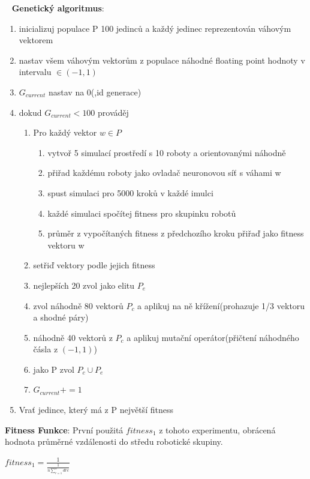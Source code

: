 \ \newline
\textbf{Genetický algoritmus}:
\begin{enumerate}
    \item inicializuj populace P 100 jedinců a každý jedinec reprezentován váhovým vektorem
    \item nastav všem váhovým vektorům z populace náhodné floating point hodnoty v intervalu $\in (-1,1)$ 
    \item $G_{current}$ nastav na 0(,id generace)
    \item dokud $G_{current} < 100$ prováděj \begin{enumerate}
        \item Pro každý vektor $w \in P$ \begin{enumerate}
            \item vytvoř 5 simulací prostředí s 10 roboty a orientovanými náhodně
            \item přiřad každému roboty jako ovladač neuronovou síť s váhami w
            \item spust simulaci pro 5000 kroků v každé imulci
            \item každé simulaci spočítej fitness pro skupinku robotů
            \item průměr z vypočítaných fitness z předchozího kroku přiřaď jako fitness vektoru w
        \end{enumerate} 
    \item setřiď vektory podle jejich fitness 
    \item nejlepších 20 zvol jako elitu $P_{e}$
    \item zvol náhodně 80 vektorů $P_c$ a aplikuj na ně křížení(prohazuje 1/3 vektoru a shodné páry)
    \item náhodně 40 vektorů z $P_c$ a aplikuj mutační operátor(přičtení náhodného čásla z $(-1,1)$)
    \item jako P zvol $P_c \cup P_e$
    \item $G_{current} += 1$
    \end{enumerate} 
    \item Vrať jedince, který má z P největší fitness    
\end{enumerate} 
\par 
\textbf{Fitness Funkce}: První použitá $fitness_1$ z tohoto experimentu, obrácená hodnota průměrné vzdálenosti do středu robotické skupiny. 
\par
\begin{center}
\textbf{$fitness_1 = \frac{1}{\frac{1}{n\sum\limits_{r=1}^{n} d{rc}}} $}
\end{center}
